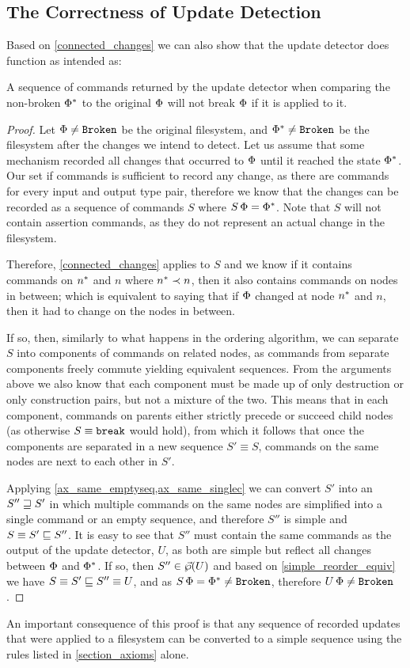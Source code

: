 
\subsection{The Correctness of Update Detection}

Based on \cref{connected_changes} we can also show that
the update detector does function as intended as:

\begin{myth}\label{update_works}
A sequence of commands returned by the update detector
when comparing the non-broken $\Phi^*$ to the original $\Phi$
will not break $\Phi$ if it is applied to it.
\end{myth}
\begin{proof}
Let $\Phi\neq\mathtt{Broken}$ be the original filesystem, and $\Phi^*\neq\mathtt{Broken}$
be the filesystem after the changes we intend to detect.
Let us assume that some mechanism recorded all changes that occurred
to $\Phi$ until it reached the state $\Phi^*$.
Our set if commands is sufficient to record any change, as
there are commands for every input and output type pair, therefore
we know that the changes can be recorded as a sequence of commands $S$
where $S\,\Phi=\Phi^*$.
Note that $S$ will not contain assertion commands, as they do not
represent an actual change in the filesystem.

Therefore, \cref{connected_changes} applies to $S$ and we know
if it contains commands on $n^*$ and $n$ where $n^*\prec n$,
then it also contains commands on nodes in between;
which is equivalent to saying that if $\Phi$ changed
at node $n^*$ and $n$, then it had to change on the nodes in between.

If so, then, similarly to what happens in the ordering algorithm,
we can separate $S$ into components of commands on related nodes,
as commands from separate components freely commute yielding equivalent sequences.
From the arguments above we also know that each component
must be made up of only destruction or only construction pairs,
but not a mixture of the two.
This means that in each component, commands on parents 
either strictly precede or succeed child nodes
(as otherwise $S\equiv\mathtt{break}$ would hold),
from which it follows that once the components are separated
in a new sequence $S'\equiv S$,
commands on the same nodes are next to each other in $S'$.

Applying \cref{ax_same_emptyseq,ax_same_singlec} we can
convert $S'$ into
an $S''\sqsupseteq S'$ in which multiple commands on the same nodes
are simplified into a single command or an empty sequence,
and therefore $S''$ is simple and $S\equiv S'\sqsubseteq S''$.
It is easy to see that $S''$ must contain the same commands
as the output of the update detector, $U$, as both are simple
but reflect all changes between $\Phi$ and $\Phi^*$.
If so, then $S''\in\vec{\wp}({U})$ and based on \cref{simple_reorder_equiv}
we have
$S\equiv S'\sqsubseteq S''\equiv U$, and as $S\,\Phi = \Phi^* \neq \mathtt{Broken}$,
therefore $U\,\Phi\neq\mathtt{Broken}$.
\end{proof}

An important consequence of this proof is that any sequence
of recorded updates that were applied to a filesystem can be
converted to a simple sequence using the rules listed in
\cref{section_axioms} alone.
